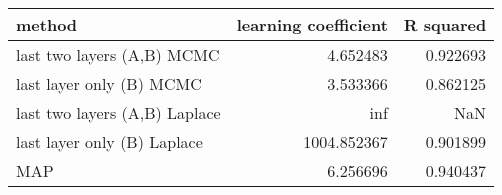 \begin{tabular}{lrr}
\toprule
                        method &  learning coefficient &  R squared \\
\midrule
    last two layers (A,B) MCMC &              4.652483 &   0.922693 \\
      last layer only (B) MCMC &              3.533366 &   0.862125 \\
 last two layers (A,B) Laplace &                   inf &        NaN \\
   last layer only (B) Laplace &           1004.852367 &   0.901899 \\
                           MAP &              6.256696 &   0.940437 \\
\bottomrule
\end{tabular}
